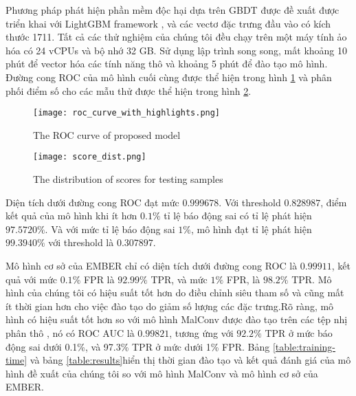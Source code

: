 Phương pháp phát hiện phần mềm độc hại dựa trên GBDT được đề xuất được triển khai với LightGBM framework \cite{ke2017lightgbm}, và các vectơ đặc trưng đầu vào có kích thước 1711. Tất cả các thử nghiệm của chúng tôi đều chạy trên một máy tính ảo hóa có 24 vCPUs và bộ nhớ 32 GB. Sử dụng lập trình song song, mất khoảng 10 phút để vector hóa các tính năng thô và khoảng 5 phút để đào tạo mô hình. Đường cong ROC của mô hình cuối cùng được thể hiện trong hình \ref{fig:roc_curve_with_highlights} và phân phối điểm số cho các mẫu thử được thể hiện trong hình \ref{fig:score_dist}.

\begin{figure}[H]
\centering
\texttt{[image: roc\_curve\_with\_highlights.png]}
\caption{The ROC curve of proposed model}
\label{fig:roc_curve_with_highlights}
\end{figure}

\begin{figure}[ht] 
\centering
\texttt{[image: score\_dist.png]}
\caption{The distribution of scores for testing samples}
\label{fig:score_dist}
\end{figure}

Diện tích dưới đường cong ROC đạt mức $0.999678$. Với threshold $0.828987$, điểm kết quả của mô hình khi ít hơn $0.1\%$ tỉ lệ báo động sai có tỉ lệ phát hiện $97.5720\%$. Và với mức tỉ lệ báo động sai $1\%$, mô hình đạt tỉ lệ phát hiện $99.3940\%$ với threshold là $0.307897$. 

Mô hình cơ sở của EMBER chỉ có diện tích dưới đường cong ROC là $0.99911$, kết quả với mức $0.1\%$ FPR là $92.99\%$ TPR, và mức $1\%$ FPR, là $98.2\%$ TPR. Mô hình của chúng tôi có hiệu suất tốt hơn do điều chỉnh siêu tham số và cũng mất ít thời gian hơn cho việc đào tạo do giảm số lượng các đặc trưng.Rõ ràng, mô hình có hiệu suất tốt hơn so với mô hình MalConv được đào tạo trên các tệp nhị phân thô \cite{anderson2018ember}, nó có ROC AUC là $0.99821$, tương ứng với $92.2\%$ TPR ở mức báo động sai dưới 0.1\%, và 97.3\% TPR ở mức dưới 1\% FPR. Bảng \ref{table:training-time} và bảng \ref{table:results}hiển thị thời gian đào tạo và kết quả đánh giá của mô hình đề xuất của chúng tôi so với mô hình MalConv và mô hình cơ sở của EMBER.

